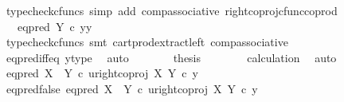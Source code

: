 \begin{isabellebody}
\ {\isacharparenleft}{\kern0pt}typecheck{\isacharunderscore}{\kern0pt}cfuncs{\isacharcomma}{\kern0pt}\ simp\ add{\isacharcolon}{\kern0pt}\ comp{\isacharunderscore}{\kern0pt}associative{}\ right{\isacharunderscore}{\kern0pt}coproj{\isacharunderscore}{\kern0pt}cfunc{\isacharunderscore}{\kern0pt}coprod{\isacharparenright}{\kern0pt}\isanewline
\ \ \ \ \isamarkupfalse%
\ \isamarkupfalse%
\ {\isachardoublequoteopen}{\isachardot}{\kern0pt}{\isachardot}{\kern0pt}{\isachardot}{\kern0pt}\ {\isacharequal}{\kern0pt}\ eq{\isacharunderscore}{\kern0pt}pred\ Y\ {\isasymcirc}\isactrlsub c\ {\isasymlangle}y{\isacharcomma}{\kern0pt}y{\isasymrangle}{\isachardoublequoteclose}\isanewline
\ \ \ \ \ \ \isamarkupfalse%
\ {\isacharparenleft}{\kern0pt}typecheck{\isacharunderscore}{\kern0pt}cfuncs{\isacharcomma}{\kern0pt}\ smt\ cart{\isacharunderscore}{\kern0pt}prod{\isacharunderscore}{\kern0pt}extract{\isacharunderscore}{\kern0pt}left\ comp{\isacharunderscore}{\kern0pt}associative{}{\isacharparenright}{\kern0pt}\isanewline
\ \ \ \ \isamarkupfalse%
\ \isamarkupfalse%
\ {\isachardoublequoteopen}{\isachardot}{\kern0pt}{\isachardot}{\kern0pt}{\isachardot}{\kern0pt}\ {\isacharequal}{\kern0pt}\ {\isasymt}{\isachardoublequoteclose}\isanewline
\ \ \ \ \ \ \isamarkupfalse%
\ eq{\isacharunderscore}{\kern0pt}pred{\isacharunderscore}{\kern0pt}iff{\isacharunderscore}{\kern0pt}eq\ y{\isacharunderscore}{\kern0pt}type\ \isamarkupfalse%
\ auto\isanewline
\ \ \ \ \isamarkupfalse%
\ \isamarkupfalse%
\ {\isacharquery}{\kern0pt}thesis\isanewline
\ \ \ \ \ \ \isamarkupfalse%
\ calculation\ \isamarkupfalse%
\ auto\isanewline
\ \ \isamarkupfalse%
\isanewline
{}\isamarkupfalse%
\isanewline
\ \ \isamarkupfalse%
\ {\isachardoublequoteopen}eq{\isacharunderscore}{\kern0pt}pred\ {\isacharparenleft}{\kern0pt}X\ {\isasymCoprod}\ Y{\isacharparenright}{\kern0pt}\ {\isasymcirc}\isactrlsub c\ {\isasymlangle}u{\isacharcomma}{\kern0pt}right{\isacharunderscore}{\kern0pt}coproj\ X\ Y\ {\isasymcirc}\isactrlsub c\ y{\isasymrangle}\ {\isasymnoteq}\ {\isasymt}{\isachardoublequoteclose}\isanewline
\ \ \isamarkupfalse%
\ \isamarkupfalse%
\ eq{\isacharunderscore}{\kern0pt}pred{\isacharunderscore}{\kern0pt}false{\isacharcolon}{\kern0pt}\ {\isachardoublequoteopen}eq{\isacharunderscore}{\kern0pt}pred\ {\isacharparenleft}{\kern0pt}X\ {\isasymCoprod}\ Y{\isacharparenright}{\kern0pt}\ {\isasymcirc}\isactrlsub c\ {\isasymlangle}u{\isacharcomma}{\kern0pt}right{\isacharunderscore}{\kern0pt}coproj\ X\ Y\ {\isasymcirc}\isactrlsub c\ y{\isasymrangle}\ {\isacharequal}{\kern0pt}\ {\isasymf}{\isachardoublequoteclose}\isanewline

\end{isabellebody}
